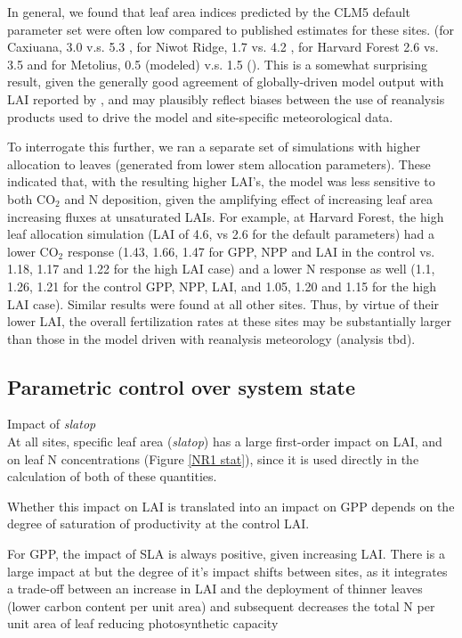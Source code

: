\documentclass[draft,linenumbers]{agujournal}
\begin{document}
In general, we found that leaf area indices predicted by the CLM5 default parameter set were often low  compared to published estimates for these sites. (for Caxiuana, 3.0 v.s. 5.3 \cite{fisher2007}, for Niwot Ridge, 1.7 vs. 4.2 \cite{bowling2009}, for Harvard Forest 2.6 vs. 3.5 \cite{williams1996} and for Metolius, 0.5 (modeled) v.s. 1.5 (\cite{spadavecchia2011}). This is a somewhat surprising result, given the generally good agreement of globally-driven model output with LAI reported by \cite{lawrence2018}, and may plausibly reflect biases between the use of reanalysis products used to drive the model and site-specific meteorological data. 

To interrogate this further, we ran a separate set of simulations with higher allocation to leaves (generated from lower stem allocation parameters). These indicated that, with the resulting higher LAI's, the model was less sensitive to both CO$_{2}$ and N deposition, given the amplifying effect of increasing leaf area increasing fluxes at unsaturated LAIs.   For example, at Harvard Forest, the high leaf allocation  simulation (LAI of 4.6, vs 2.6 for the default parameters) had a lower CO$_{2}$ response (1.43, 1.66, 1.47 for GPP, NPP and LAI in the control vs. 1.18, 1.17 and 1.22 for the high LAI case) and a lower N response as well (1.1, 1.26, 1.21 for the control GPP, NPP, LAI, and 1.05, 1.20 and 1.15 for the high LAI case). Similar results were found at all other sites.  Thus, by virtue of their lower LAI, the overall fertilization rates at these sites may be substantially larger than those in the model driven with reanalysis meteorology (analysis tbd). 

\subsection{Parametric control over system state}

Impact of \emph{slatop}\\
At all sites, specific leaf area (\emph{slatop}) has a large first-order impact on LAI,  and on leaf N concentrations (Figure \ref{NR1 stat}), since it is used directly in the calculation of both of these quantities. 

Whether this impact on LAI is translated into an impact on GPP depends on the degree of saturation of productivity at the control LAI. 

For GPP, the impact of SLA is always positive, given increasing LAI. There is a large impact at  but the degree of it's impact shifts between sites, as it integrates a trade-off between an increase in LAI and the deployment of thinner leaves (lower carbon content per unit area) and subsequent decreases the total N per unit area of leaf reducing photosynthetic capacity 
\end{document}
